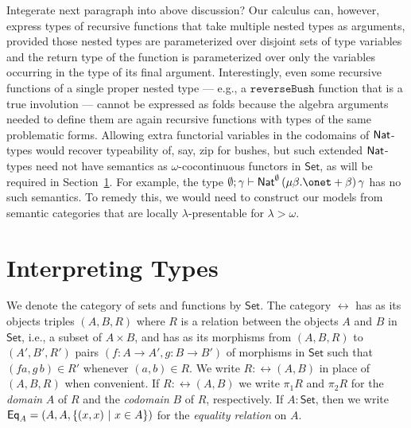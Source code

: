 \documentclass{lmcs}
\theoremstyle{plain}\newtheorem{satz}[thm]{Satz}
\newcommand{\set}{\mathsf{Set}}
\begin{document}
{\color{red} Integerate next paragraph into above discussion?} Our
calculus can, however, express types of recursive functions that take
multiple nested types as arguments, provided those nested types are
parameterized over disjoint sets of type variables and the return type
of the function is parameterized over only the variables occurring in
the type of its final argument.  Interestingly, even some recursive
functions of a single proper nested type --- e.g., a
$\mathtt{reverseBush}$ function that is a true involution --- cannot
be expressed as folds because the algebra arguments needed to define
them are again recursive functions
with types of the same problematic forms.
Allowing extra functorial variables in the codomains of $\mathsf{Nat}$-types
would recover typeability of, say, zip for bushes, but such extended
$\mathsf{Nat}$-types need not have semantics as $\omega$-cocontinuous functors
in $\set$, as will be required in Section~\ref{sec:type-interp}. For
example,
the type $\emptyset; \gamma \vdash \Nat^\emptyset\, (\mu \beta. \onet + \beta)\,
\gamma$ has no such semantics. To remedy this, we would need to
construct our models from semantic categories that are locally
$\lambda$-presentable for $\lambda > \omega$.
%

\section{Interpreting Types}\label{sec:type-interp}

We denote the category of sets and functions by $\set$. The category
$\rel$ has as its objects triples $(A,B,R)$ where $R$ is a relation
between the objects $A$ and $B$ in $\set$, i.e., a subset of $A \times
B$, and has as its morphisms from $(A,B,R)$ to $(A',B',R')$ pairs $(f
: A \to A',g : B \to B')$ of morphisms in $\set$ such that $(f a,g\,b)
\in R'$ whenever $(a,b) \in R$. We write $R : \rel(A,B)$ in place of
$(A,B,R)$ when convenient.  If $R : \rel(A,B)$ we write $\pi_1 R$ and
$\pi_2 R$ for the {\em domain} $A$ of $R$ and the {\em codomain} $B$
of $R$, respectively.  If $A : \set$, then we write $\mathsf{Eq}_A =
(A,A,\{(x,x)~|~ x \in A\})$ for the {\em equality relation} on $A$.
\end{document}
